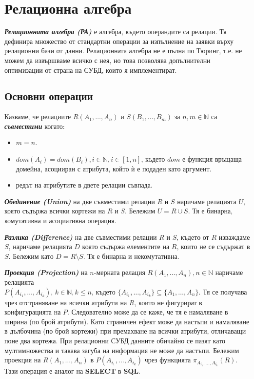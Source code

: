 \documentclass[fleqn,12pt]{article}
\begin{document}
\section{Релационна алгебра}

\textit{\textbf{Релационната алгебра (РА)}} е алгебра, където операндите са релации.
Тя дефинира множество от стандартни операции за изпълнение на заявки върху релационни бази от данни.
Релационната алгебра не е пълна по Тюринг, т.е. не можем да извършваме всичко с нея, но това позволява допълнителни оптимизации от страна на СУБД, които я имплементират.

\subsection{Основни операции}

Казваме, че релациите $R(A_1, \dots, A_n)$ и $S(B_1, \dots, B_m)$ за $n, m \in \mathbb{N}$ са \textbf{\textit{съвместими}} когато:
\begin{itemize}
    \item $m = n$.
    \item $dom(A_i) = dom(B_i), i \in \mathbb{N}, i \in [1, n]$, където $dom$ е функция връщаща домейна, асоцииран с атрибута, който ѝ е подаден като аргумент.
    \item редът на атрибутите в двете релации съвпада.
\end{itemize}
\bigbreak

\textbf{\textit{Обединение (Union)}} на две съвместими релации $R$ и $S$ наричаме релацията $U$, която съдържа всички кортежи на $R$ и $S$.
Бележим $U = R \cup S$.
Тя е бинарна, комутативна и асоциативна операция.
\bigbreak

\textbf{\textit{Разлика (Difference)}} на две съвместими релации $R$ и $S$, където от $R$ изваждаме $S$, наричаме релацията $D$ която съдържа елементите на $R$, които не се съдържат в $S$.
Бележим като $D = R \setminus S$.
Тя е бинарна и некомутативна.
\bigbreak

\textbf{\textit{Проекция (Projection)}} на $n$-мерната релация $R(A_1, \dots, A_n), n \in \mathbb{N}$ наричаме релацията \\
$P(A_{i_1}, \dots, A_{i_k})$, $k \in \mathbb{N}, k \leq n$, където $\{A_{i_1}, \dots, A_{i_k}\} \subseteq \{A_1, \dots, A_n\}$.
Тя се получава чрез отстраняване на всички атрибути на $R$, които не фигурират в конфигурацията на $P$.
Следователно може да се каже, че тя е намаляване в ширина (по брой атрибути).
Като страничен ефект може да настъпи и намаляване в дълбочина (по брой кортежи) при премахване на всички атрибути, отличаващи поне два кортежа.
При релационни СУБД данните обичайно се пазят като мултимножества и такава загуба на информация не може да настъпи.
\bigbreak
Бележим проекция на $R(A_1, \dots, A_n)$ в $P(A_{i_1}, \dots, A_{i_k})$ чрез функцията $\pi_{A_{i_1}, \dots, A_{i_k}}(R)$.
Тази операция е аналог на \textbf{SELECT} в \textbf{SQL}.
\bigbreak
\end{document}
